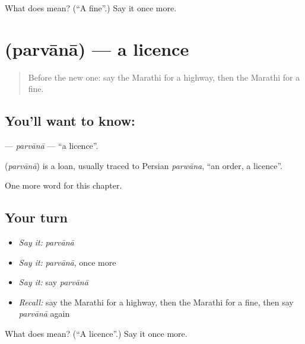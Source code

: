 \begin{tcolorbox}[breakable,colback=teal!4,colframe=teal!35!black,title={Before you move on}]
What does  mean? (\textquotedblleft{}A fine\textquotedblright{}.) Say it once more.
\end{tcolorbox}
\section[\texorpdfstring{\mr{परवाना} (parvānā)}{परवाना (parvānā)}]{ (parvānā) — a licence}

\label{lesson:MR-C266-parvana}



\begin{quote}
Before the new one: say the Marathi for a highway, then the Marathi for a fine.
\end{quote}

\subsection*{You'll want to know: }
\textbf{} — \emph{parvānā} — \textquotedblleft{}a licence\textquotedblright{}.

\begin{cousinweb}
\textbf{} (\emph{parvānā}) is a loan, usually traced to Persian \emph{parwāna}, \textquotedblleft{}an order, a licence\textquotedblright{}.
\end{cousinweb}

\begin{grammarlens}[title={What you've built}]
One more word for this chapter.
\end{grammarlens}

\subsection*{Your turn}
\begin{itemize}
\raggedright
  \item \emph{Say it:} \emph{parvānā}
  \item \emph{Say it:} \emph{parvānā}, once more
  \item \emph{Say it:} say \emph{parvānā}
  \item \emph{Recall:} say the Marathi for a highway, then the Marathi for a fine, then say \emph{parvānā} again
\end{itemize}

\begin{tcolorbox}[breakable,colback=teal!4,colframe=teal!35!black,title={Before you move on}]
What does  mean? (\textquotedblleft{}A licence\textquotedblright{}.) Say it once more.
\end{tcolorbox}
